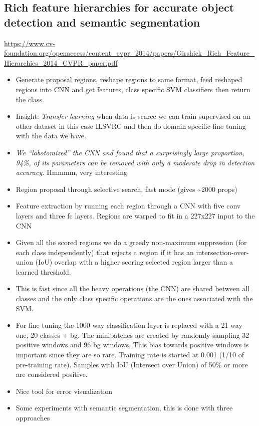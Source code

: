 \documentclass[11pt]{article}
\begin{document}
\subsection{Rich feature hierarchies for accurate object detection and semantic segmentation}
\label{sec:org65ec8a0}
\url{https://www.cv-foundation.org/openaccess/content\_cvpr\_2014/papers/Girshick\_Rich\_Feature\_Hierarchies\_2014\_CVPR\_paper.pdf}
\begin{itemize}
\item Generate proposal regions, reshape regions to same format, feed reshaped regions into CNN and get features, class specific SVM classifiers then return the class.
\item Insight: \emph{Transfer learning} when data is scarce we can train supervised on an other dataset in this case ILSVRC and then do domain specific fine tuning with the data ẃe have.
\item \emph{We “lobotomized” the CNN and found that a surprisingly large proportion, 94\%, of its parameters can be removed with only a moderate drop in detection accuracy.} Hmmmm, very interesting
\item Region proposal through selective search, fast mode (gives \textasciitilde{}2000 props)
\item Feature extraction by running each region through a CNN with five conv layers and three fc layers. Regions are warped to fit in a 227x227 input to the CNN
\item Given all the scored regions we do  a greedy non-maximum suppression (for each class independently) that rejects a region if it has an intersection-over-union (IoU) overlap with a higher scoring selected region larger than a learned threshold.
\item This is fast since all the heavy operations (the CNN) are shared between all classes and the only class specific operations are the ones associated with the SVM.
\item For fine tuning the 1000 way classification layer is replaced with a 21 way one, 20 classes + bg. The minibatches are created by randomly sampling 32 positive windows and 96 bg windows. This bias towards positive windows is important since they are so rare. Training rate is started at 0.001 (1/10 of pre-training rate). Samples with IoU (Intersect over Union) of 50\% or more are considered positive.
\item Nice tool for error visualization
\item Some experiments with semantic segmentation, this is done with three approaches

\end{itemize}
\end{document}
